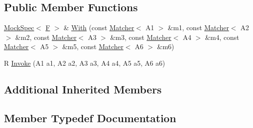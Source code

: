 \subsection*{Public Member Functions}
\begin{DoxyCompactItemize}
\item 
\hyperlink{classtesting_1_1internal_1_1_mock_spec}{Mock\+Spec}$<$ \hyperlink{classtesting_1_1internal_1_1_function_mocker_3_01_r_07_a1_00_01_a2_00_01_a3_00_01_a4_00_01_a5_00_01_a6_08_4_a5373cd66051f0a54e83b0497004df058}{F} $>$ \& \hyperlink{classtesting_1_1internal_1_1_function_mocker_3_01_r_07_a1_00_01_a2_00_01_a3_00_01_a4_00_01_a5_00_01_a6_08_4_ab34f4d748a5a2fb68d6d27d963572c03}{With} (const \hyperlink{classtesting_1_1_matcher}{Matcher}$<$ A1 $>$ \&m1, const \hyperlink{classtesting_1_1_matcher}{Matcher}$<$ A2 $>$ \&m2, const \hyperlink{classtesting_1_1_matcher}{Matcher}$<$ A3 $>$ \&m3, const \hyperlink{classtesting_1_1_matcher}{Matcher}$<$ A4 $>$ \&m4, const \hyperlink{classtesting_1_1_matcher}{Matcher}$<$ A5 $>$ \&m5, const \hyperlink{classtesting_1_1_matcher}{Matcher}$<$ A6 $>$ \&m6)
\item 
R \hyperlink{classtesting_1_1internal_1_1_function_mocker_3_01_r_07_a1_00_01_a2_00_01_a3_00_01_a4_00_01_a5_00_01_a6_08_4_a8499277f15101fefacbb0c9d93b8153b}{Invoke} (A1 a1, A2 a2, A3 a3, A4 a4, A5 a5, A6 a6)
\end{DoxyCompactItemize}
\subsection*{Additional Inherited Members}


\subsection{Member Typedef Documentation}
\mbox{\label{classtesting_1_1internal_1_1_function_mocker_3_01_r_07_a1_00_01_a2_00_01_a3_00_01_a4_00_01_a5_00_01_a6_08_4_a0c8bc671adc8e67e8a49a01432407139}} 
